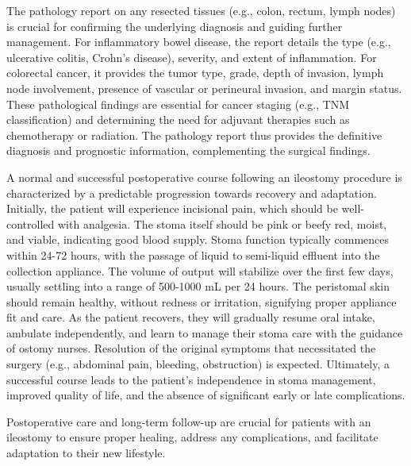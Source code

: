 The pathology report on any resected tissues (e.g., colon, rectum, lymph nodes) is crucial for confirming the underlying diagnosis and guiding further management. For inflammatory bowel disease, the report details the type (e.g., ulcerative colitis, Crohn's disease), severity, and extent of inflammation. For colorectal cancer, it provides the tumor type, grade, depth of invasion, lymph node involvement, presence of vascular or perineural invasion, and margin status. These pathological findings are essential for cancer staging (e.g., TNM classification) and determining the need for adjuvant therapies such as chemotherapy or radiation. The pathology report thus provides the definitive diagnosis and prognostic information, complementing the surgical findings.

A normal and successful postoperative course following an ileostomy procedure is characterized by a predictable progression towards recovery and adaptation. Initially, the patient will experience incisional pain, which should be well-controlled with analgesia. The stoma itself should be pink or beefy red, moist, and viable, indicating good blood supply. Stoma function typically commences within 24-72 hours, with the passage of liquid to semi-liquid effluent into the collection appliance. The volume of output will stabilize over the first few days, usually settling into a range of 500-1000 mL per 24 hours. The peristomal skin should remain healthy, without redness or irritation, signifying proper appliance fit and care. As the patient recovers, they will gradually resume oral intake, ambulate independently, and learn to manage their stoma care with the guidance of ostomy nurses. Resolution of the original symptoms that necessitated the surgery (e.g., abdominal pain, bleeding, obstruction) is expected. Ultimately, a successful course leads to the patient's independence in stoma management, improved quality of life, and the absence of significant early or late complications.

Postoperative care and long-term follow-up are crucial for patients with an ileostomy to ensure proper healing, address any complications, and facilitate adaptation to their new lifestyle.

